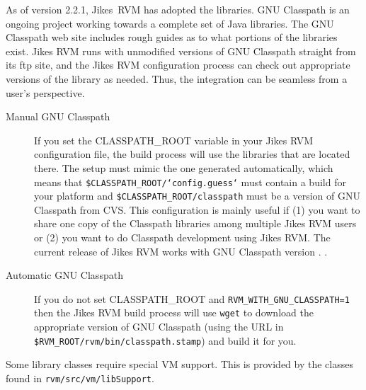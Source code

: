  As of version 2.2.1, Jikes\TMweb\ RVM has adopted the
 libraries.  GNU
Classpath is an ongoing project working towards a complete set of
Java\TMweb{} libraries.  The GNU Classpath web site includes
rough guides as to what portions of the libraries exist.  Jikes RVM
runs with unmodified versions of GNU Classpath straight from its ftp
site, and the Jikes RVM configuration process can check out
appropriate versions of the library as needed.  Thus, the integration
can be seamless from a user's perspective.

\begin{description}
\item[Manual GNU Classpath] If you set the CLASS\-PATH\_ROOT variable in
your Jikes RVM configuration file, the build process will use the
libraries that are located there.  The setup must mimic the one
generated automatically, which means that
{\tt \$CLASS\-PATH\_ROOT/\-`con\-fig.guess`} must contain a build for your platform
and {\tt \$CLASS\-PATH\_ROOT/\-class\-path} must be a version of GNU Classpath from
CVS.  This configuration is mainly useful if (1) you want to share one
copy of the Classpath libraries among multiple Jikes RVM users or (2)
you want to do Classpath development using Jikes RVM. The
current release of Jikes RVM works with GNU Classpath version
\classpathversion.  .

\item[Automatic GNU Classpath] If you do not set CLASS\-PATH\_\-ROOT and 
{\tt RVM\_\-WITH\_\-GNU\_\-CLASS\-PATH=1} then the Jikes RVM build process
will use {\tt wget} to download the appropriate version of GNU Classpath (using
the URL in {\tt \$RVM\_\-ROOT/\-rvm/\-bin/\-class\-path.stamp}) and build it for
you. 
\end{description}

Some library classes require special VM support.  This is provided by
the classes found in {\tt rvm/\-src/\-vm/\-lib\-Sup\-port}. 

